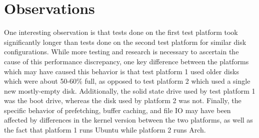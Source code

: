 \documentclass[12pt]{article}
\begin{document}
\section{Observations}
One interesting observation is that tests done on the first test platform took significantly longer
than tests done on the second test platform for similar disk configurations. While more testing and
research is necessary to ascertain the cause of this performance discrepancy, one key difference between
the platforms which may have caused this behavior is that test platform 1 used older disks which were
about 50-60\% full, as opposed to test platform 2 which used a single new mostly-empty disk. Additionally,
the solid state drive used by test platform 1 was the boot drive, whereas the disk used by platform 2
was not. Finally, the specific behavior of prefetching, buffer caching, and file IO may have been affected by differences
in the kernel version between the two platforms, as well as the fact that platform 1 runs Ubuntu while platform 2 runs Arch. \\
\end{document}
